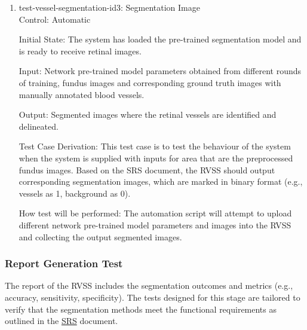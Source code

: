 \documentclass[12pt, titlepage]{article}
\begin{document}
\begin{enumerate}

\item{test-vessel-segmentation-id3: Segmentation Image\\}
\label{test-id-3}
Control: Automatic 
					
Initial State: The system has loaded the pre-trained segmentation model and is ready to receive retinal images.
					
Input: Network pre-trained model parameters obtained from different rounds of training, fundus images and corresponding ground truth images with manually annotated blood vessels.
					
Output: Segmented images where the retinal vessels are identified and delineated.

Test Case Derivation: This test case is to test the behaviour of the system when the system is supplied with inputs for area that are the preprocessed fundus images. Based on the SRS document, the RVSS should output corresponding segmentation images, which are marked in binary format (e.g., vessels as 1, background as 0).
					
How test will be performed: The automation script will attempt to upload different network pre-trained model parameters and images into the RVSS and collecting the output segmented images.



\end{enumerate}


\subsubsection{Report Generation Test}
\label{report_generation}
The report of the RVSS includes the segmentation outcomes and metrics (e.g., accuracy, sensitivity, specificity). The tests designed for this stage are tailored to verify that the segmentation methods meet the functional requirements as outlined in the \href{https://github.com/lele0007/Blood-vessel-segmentation/blob/main/docs/SRS/SRS.pdf}{SRS} document.
\end{document}
